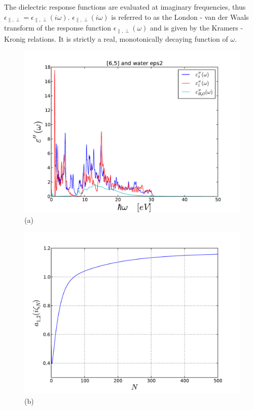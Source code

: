 \documentclass[onecolumn,letterpaper,amsmath,amssymb,floatfix,aps,superscriptaddress]{revtex4}
\begin{document}
The dielectric response functions are evaluated at imaginary frequencies, 
thus $\epsilon_{\parallel,\perp} = \epsilon_{\parallel,\perp}(i \omega)$. $\epsilon_{\parallel,\perp}(i \omega)$ is referred to as the London - van der Waals 
transform of the response function $\epsilon_{\parallel,\perp}(\omega)$ and is given by the Kramers - Kronig relations. It is strictly a real, monotonically 
decaying function of $\omega$. 
\begin{figure}[t!]
\begin{center}
\begin{minipage}[b]{0.40\textwidth}
\begin{center}
\includegraphics[width=1.2\textwidth]{eps_65.pdf} (a)
\end{center}
\end{minipage}
\hskip 43pt
\begin{minipage}[b]{0.40\textwidth}
\begin{center}
\includegraphics[width=1.2\textwidth]{aiz_65.pdf} (b)

\end{center}
\end{minipage}
\end{center}
\end{figure}
\end{document}
